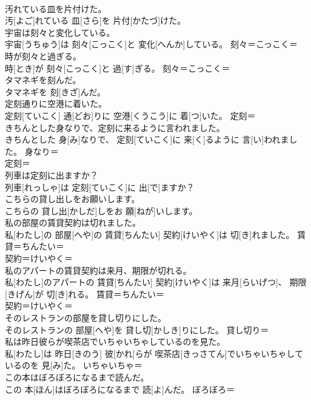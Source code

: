 \documentclass[8pt]{extreport}
\begin{document}
\begin{CJK}{UTF8}{min}
\\	汚れている皿を片付けた。	
\\	汚[よご]れている 皿[さら]を 片付[かたづ]けた。	
\\	宇宙は刻々と変化している。	
\\	宇宙[うちゅう]は 刻々[こっこく]と 変化[へんか]している。	刻々＝こっこく＝ 
\\	時が刻々と過ぎる。	
\\	時[とき]が 刻々[こっこく]と 過[す]ぎる。	刻々＝こっこく＝ 
\\	タマネギを刻んだ。	
\\	タマネギを 刻[きざ]んだ。	
\\	定刻通りに空港に着いた。	
\\	定刻[ていこく] 通[どお]りに 空港[くうこう]に 着[つ]いた。	定刻＝ 
\\	きちんとした身なりで、定刻に来るように言われました。	
\\	きちんとした 身[み]なりで、 定刻[ていこく]に 来[く]るように 言[い]われました。	身なり＝ 
\\	定刻＝ 
\\	列車は定刻に出ますか？	
\\	列車[れっしゃ]は 定刻[ていこく]に 出[で]ますか？	
\\	こちらの貸し出しをお願いします。	
\\	こちらの 貸し出[かしだ]しをお 願[ねが]いします。	
\\	私の部屋の賃貸契約は切れました。	
\\	私[わたし]の 部屋[へや]の 賃貸[ちんたい] 契約[けいやく]は 切[き]れました。	賃貸＝ちんたい＝ 
\\	契約＝けいやく＝ 
\\	私のアパートの賃貸契約は来月、期限が切れる。	
\\	私[わたし]のアパートの 賃貸[ちんたい] 契約[けいやく]は 来月[らいげつ]、 期限[きげん]が 切[き]れる。	賃貸＝ちんたい＝ 
\\	契約＝けいやく＝ 
\\	そのレストランの部屋を貸し切りにした。	
\\	そのレストランの 部屋[へや]を 貸し切[かしき]りにした。	貸し切り＝ 
\\	私は昨日彼らが喫茶店でいちゃいちゃしているのを見た。	
\\	私[わたし]は 昨日[きのう] 彼[かれ]らが 喫茶店[きっさてん]でいちゃいちゃしているのを 見[み]た。	いちゃいちゃ＝ 
\\	この本はぼろぼろになるまで読んだ。	
\\	この 本[ほん]はぼろぼろになるまで 読[よ]んだ。	ぼろぼろ＝ 

\end{CJK}
\end{document}

